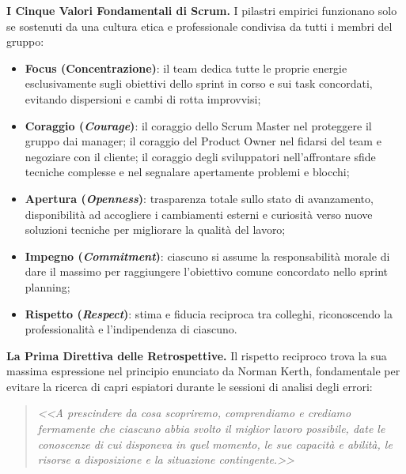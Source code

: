 \documentclass[12pt]{extarticle}
\begin{document}
\medskip
\noindent \textbf{I Cinque Valori Fondamentali di Scrum.} I pilastri empirici funzionano solo se sostenuti da una cultura etica e professionale condivisa da tutti i membri del gruppo:
\begin{itemize}
    \item \textbf{Focus (Concentrazione)}: il team dedica tutte le proprie energie esclusivamente sugli obiettivi dello sprint in corso e sui task concordati, evitando dispersioni e cambi di rotta improvvisi;
    \item \textbf{Coraggio (\textit{Courage})}: il coraggio dello Scrum Master nel proteggere il gruppo dai manager; il coraggio del Product Owner nel fidarsi del team e negoziare con il cliente; il coraggio degli sviluppatori nell'affrontare sfide tecniche complesse e nel segnalare apertamente problemi e blocchi;
    \item \textbf{Apertura (\textit{Openness})}: trasparenza totale sullo stato di avanzamento, disponibilità ad accogliere i cambiamenti esterni e curiosità verso nuove soluzioni tecniche per migliorare la qualità del lavoro;
    \item \textbf{Impegno (\textit{Commitment})}: ciascuno si assume la responsabilità morale di dare il massimo per raggiungere l'obiettivo comune concordato nello sprint planning;
    \item \textbf{Rispetto (\textit{Respect})}: stima e fiducia reciproca tra colleghi, riconoscendo la professionalità e l'indipendenza di ciascuno.
\end{itemize}

\medskip
\noindent \textbf{La Prima Direttiva delle Retrospettive.} Il rispetto reciproco trova la sua massima espressione nel principio enunciato da Norman Kerth, fondamentale per evitare la ricerca di capri espiatori durante le sessioni di analisi degli errori:
\begin{quote}
    \textit{<<A prescindere da cosa scopriremo, comprendiamo e crediamo fermamente che ciascuno abbia svolto il miglior lavoro possibile, date le conoscenze di cui disponeva in quel momento, le sue capacità e abilità, le risorse a disposizione e la situazione contingente.>>}
\end{quote}
\end{document}
